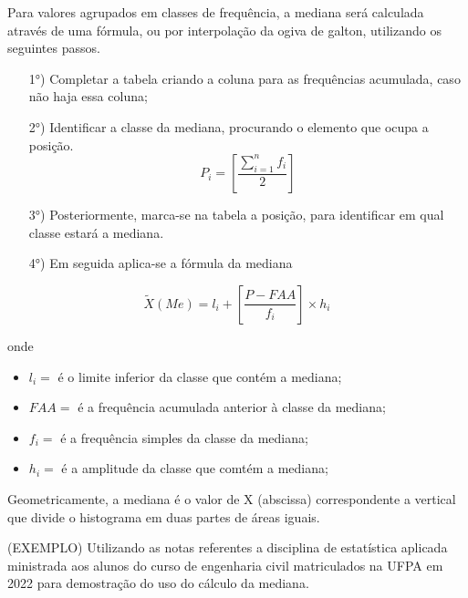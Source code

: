 Para valores agrupados em classes de frequência, a mediana será calculada através de uma fórmula, ou por interpolação da ogiva de galton, utilizando os seguintes passos.



\begin{enumerate}
\item [{1°)}] Completar a tabela criando a coluna para as frequências acumulada, caso não haja essa coluna;
\item [{2°)}]Identificar a classe da mediana, procurando o elemento que ocupa a posição.
$$ P_{i} = \left[\frac{\sum_{i=1}^{n}f_{i}}{2} \right]  $$
\item [{3°)}] Posteriormente, marca-se na tabela a posição, para identificar em qual classe estará a mediana.
\item [{4°)}] Em seguida aplica-se a fórmula da mediana
\end{enumerate}

\begin{equation}\label{}
    \tilde{X}(Me)=l_{i}+\left[\frac{P-FAA}{f_{i}}\right]\times h_{i}
\end{equation}

 onde

 \begin{itemize}
   \item $l_{i}=$ é o limite inferior da classe que contém a mediana;
   \item $FAA=$ é a frequência acumulada anterior à classe da mediana;
   \item $f_{i}=$ é a frequência simples da classe da mediana;
   \item $h_{i}=$ é a amplitude da classe que comtém a mediana;
 \end{itemize}


Geometricamente, a mediana é o valor de X (abscissa) correspondente a vertical que divide o histograma em duas partes de áreas iguais.\vskip0.3cm


(EXEMPLO) Utilizando as notas referentes a disciplina de estatística aplicada ministrada aos alunos do curso de engenharia civil matriculados na UFPA em 2022 para demostração do uso do cálculo da mediana.



